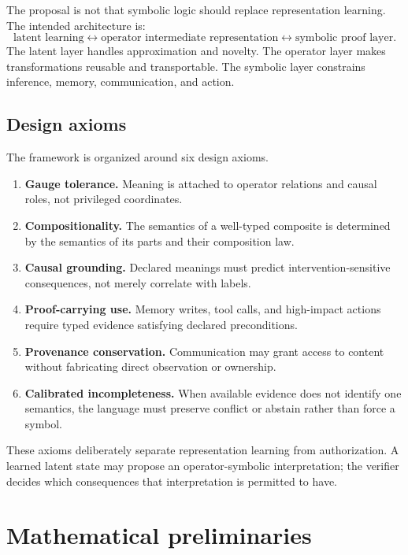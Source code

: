 \documentclass[11pt]{article}
\theoremstyle{definition}
\theoremstyle{remark}
\begin{document}
The proposal is not that symbolic logic should replace representation learning. The intended architecture is:
\begin{equation}
\boxed{
\text{latent learning}
\leftrightarrow
\text{operator intermediate representation}
\leftrightarrow
\text{symbolic proof layer}.
}
\label{eq:hybrid}
\end{equation}
The latent layer handles approximation and novelty. The operator layer makes transformations reusable and transportable. The symbolic layer constrains inference, memory, communication, and action.

\subsection{Design axioms}

The framework is organized around six design axioms.
\begin{enumerate}[leftmargin=1.7em,label=\textbf{A\arabic*.}]
  \item \textbf{Gauge tolerance.} Meaning is attached to operator relations and causal roles, not privileged coordinates.
  \item \textbf{Compositionality.} The semantics of a well-typed composite is determined by the semantics of its parts and their composition law.
  \item \textbf{Causal grounding.} Declared meanings must predict intervention-sensitive consequences, not merely correlate with labels.
  \item \textbf{Proof-carrying use.} Memory writes, tool calls, and high-impact actions require typed evidence satisfying declared preconditions.
  \item \textbf{Provenance conservation.} Communication may grant access to content without fabricating direct observation or ownership.
  \item \textbf{Calibrated incompleteness.} When available evidence does not identify one semantics, the language must preserve conflict or abstain rather than force a symbol.
\end{enumerate}

These axioms deliberately separate representation learning from authorization. A learned latent state may propose an operator-symbolic interpretation; the verifier decides which consequences that interpretation is permitted to have.

\section{Mathematical preliminaries}
\end{document}
